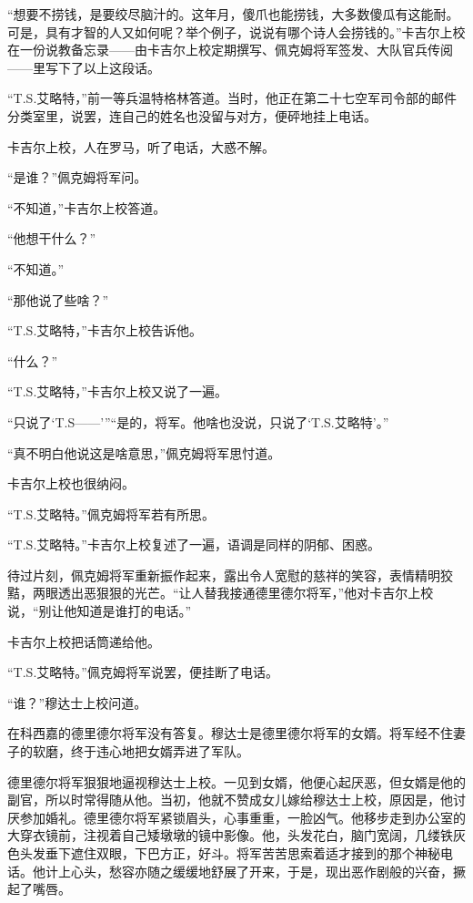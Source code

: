     “想要不捞钱，是要绞尽脑汁的。这年月，傻爪也能捞钱，大多数傻瓜有这能耐。可是，具有才智的人又如何呢？举个例子，说说有哪个诗人会捞钱的。”卡吉尔上校在一份说教备忘录——由卡吉尔上校定期撰写、佩克姆将军签发、大队官兵传阅——里写下了以上这段话。

    “T.S.艾略特，”前一等兵温特格林答道。当时，他正在第二十七空军司令部的邮件分类室里，说罢，连自己的姓名也没留与对方，便砰地挂上电话。

    卡吉尔上校，人在罗马，听了电话，大惑不解。

    “是谁？”佩克姆将军问。

    “不知道，”卡吉尔上校答道。

    “他想干什么？”

    “不知道。”

    “那他说了些啥？”

    “T.S.艾略特，”卡吉尔上校告诉他。

    “什么？”

    “T.S.艾略特，”卡吉尔上校又说了一遍。

    “只说了‘T.S——’”“是的，将军。他啥也没说，只说了‘T.S.艾略特’。”

    “真不明白他说这是啥意思，”佩克姆将军思忖道。

    卡吉尔上校也很纳闷。

    “T.S.艾略特。”佩克姆将军若有所思。

    “T.S.艾略特。”卡吉尔上校复述了一遍，语调是同样的阴郁、困惑。

    待过片刻，佩克姆将军重新振作起来，露出令人宽慰的慈祥的笑容，表情精明狡黠，两眼透出恶狠狠的光芒。“让人替我接通德里德尔将军，”他对卡吉尔上校说，“别让他知道是谁打的电话。”

    卡吉尔上校把话筒递给他。

    “T.S.艾略特。”佩克姆将军说罢，便挂断了电话。

    “谁？”穆达士上校问道。

    在科西嘉的德里德尔将军没有答复。穆达士是德里德尔将军的女婿。将军经不住妻子的软磨，终于违心地把女婿弄进了军队。

    德里德尔将军狠狠地逼视穆达士上校。一见到女婿，他便心起厌恶，但女婿是他的副官，所以时常得随从他。当初，他就不赞成女儿嫁给穆达士上校，原因是，他讨厌参加婚礼。德里德尔将军紧锁眉头，心事重重，一脸凶气。他移步走到办公室的大穿衣镜前，注视着自己矮墩墩的镜中影像。他，头发花白，脑门宽阔，几缕铁灰色头发垂下遮住双眼，下巴方正，好斗。将军苦苦思索着适才接到的那个神秘电话。他计上心头，愁容亦随之缓缓地舒展了开来，于是，现出恶作剧般的兴奋，撅起了嘴唇。

